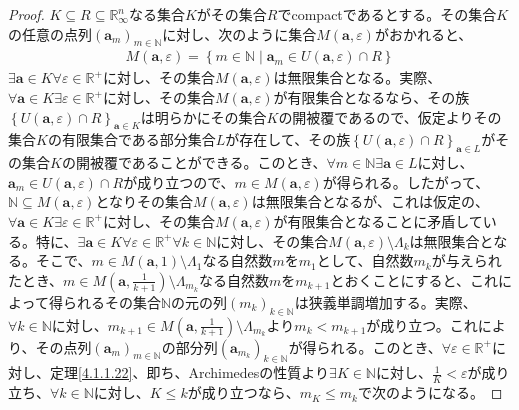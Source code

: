 \documentclass[dvipdfmx]{jsarticle}
\begin{document}
\begin{proof}
$K \subseteq R \subseteq \mathbb{R}_{\infty}^{n}$なる集合$K$がその集合$R$でcompactであるとする。その集合$K$の任意の点列$\left( \mathbf{a}_{m} \right)_{m \in \mathbb{N}}$に対し、次のように集合$M\left( \mathbf{a},\varepsilon \right)$がおかれると、
\begin{align*}
M\left( \mathbf{a},\varepsilon \right) = \left\{ m \in \mathbb{N} \middle| \mathbf{a}_{m} \in U\left( \mathbf{a},\varepsilon \right) \cap R \right\}
\end{align*}
$\exists\mathbf{a} \in K\forall\varepsilon \in \mathbb{R}^{+}$に対し、その集合$M\left( \mathbf{a},\varepsilon \right)$は無限集合となる。実際、$\forall\mathbf{a} \in K\exists\varepsilon \in \mathbb{R}^{+}$に対し、その集合$M\left( \mathbf{a},\varepsilon \right)$が有限集合となるなら、その族$\left\{ U\left( \mathbf{a},\varepsilon \right) \cap R \right\}_{\mathbf{a} \in K}$は明らかにその集合$K$の開被覆であるので、仮定よりその集合$K$の有限集合である部分集合$L$が存在して、その族$\left\{ U\left( \mathbf{a},\varepsilon \right) \cap R \right\}_{\mathbf{a} \in L}$がその集合$K$の開被覆であることができる。このとき、$\forall m \in \mathbb{N}\exists\mathbf{a} \in L$に対し、$\mathbf{a}_{m} \in U\left( \mathbf{a},\varepsilon \right) \cap R$が成り立つので、$m \in M\left( \mathbf{a},\varepsilon \right)$が得られる。したがって、$\mathbb{N} \subseteq M\left( \mathbf{a},\varepsilon \right)$となりその集合$M\left( \mathbf{a},\varepsilon \right)$は無限集合となるが、これは仮定の、$\forall\mathbf{a} \in K\exists\varepsilon \in \mathbb{R}^{+}$に対し、その集合$M\left( \mathbf{a},\varepsilon \right)$が有限集合となることに矛盾している。特に、$\exists\mathbf{a} \in K\forall\varepsilon \in \mathbb{R}^{+}\forall k \in \mathbb{N}$に対し、その集合$M\left( \mathbf{a},\varepsilon \right) \setminus \varLambda_{k}$は無限集合となる。そこで、$m \in M\left( \mathbf{a},1 \right) \setminus \varLambda_{1}$なる自然数$m$を$m_{1}$として、自然数$m_{k}$が与えられたとき、$m \in M\left( \mathbf{a},\frac{1}{k + 1} \right) \setminus \varLambda_{m_{k}}$なる自然数$m$を$m_{k + 1}$とおくことにすると、これによって得られるその集合$\mathbb{N}$の元の列$\left( m_{k} \right)_{k \in \mathbb{N}}$は狭義単調増加する。実際、$\forall k \in \mathbb{N}$に対し、$m_{k + 1} \in M\left( \mathbf{a},\frac{1}{k + 1} \right) \setminus \varLambda_{m_{k}}$より$m_{k} < m_{k + 1}$が成り立つ。これにより、その点列$\left( \mathbf{a}_{m} \right)_{m \in \mathbb{N}}$の部分列$\left( \mathbf{a}_{m_{k}} \right)_{k \in \mathbb{N}}$が得られる。このとき、$\forall\varepsilon \in \mathbb{R}^{+}$に対し、定理\ref{4.1.1.22}、即ち、Archimedesの性質より$\exists K \in \mathbb{N}$に対し、$\frac{1}{K} < \varepsilon$が成り立ち、$\forall k \in \mathbb{N}$に対し、$K \leq k$が成り立つなら、$m_{K} \leq m_{k}$で次のようになる。

\end{proof}
\end{document}
